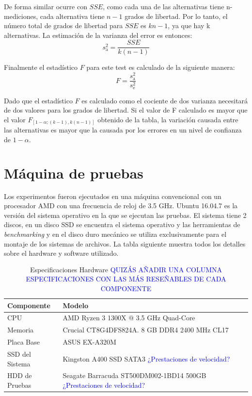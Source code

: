 De forma similar ocurre con $SSE$, como cada una de las alternativas tiene n-mediciones, cada alternativa tiene $n-1$ grados de libertad. Por lo tanto, el número total de grados de libertad para $SSE$ es $kn-1$, ya que hay k alternativas. La estimación de la varianza del error es entonces: 
$$
s_{\mathrm{a}}^{2}=\frac{S S E}{k(n-1)}
$$

Finalmente el estadístico $F$ para este test es calculado de la siguiente manera: $$
F=\frac{s_{\mathrm{a}}^{2}}{s_{\mathrm{e}}^{2}}
$$

Dado que el estadístico $F$ es calculado como el cociente de dos varianza necesitará de dos valores para los grados de libertad. Si el valor de F calculado es mayor que el valor $F_{[1-\alpha ;(k-1), k(n-1)]}$ obtenido de la tabla, la variación causada entre las alternativas es mayor que la causada por los errores en un nivel de confianza de $1-\alpha$.



\section{Máquina de pruebas}
Los experimentos fueron ejecutados en una máquina convencional con un procesador AMD con una frecuencia de reloj de 3.5 GHz. Ubuntu 16.04.7 es la versión del sistema operativo en la que se ejecutan las pruebas. El sistema tiene 2 discos, en un disco SSD se encuentra el sistema operativo y las herramientas de \textit{benchmarking} y en el disco duro mecánico se utiliza exclusivamente para el montaje de los sistemas de archivos. La tabla siguiente muestra todos los detalles sobre el hardware y software utilizado.
\begin{table}[h]
    \centering
    \begin{tabular}{|l|l|}
    \hline
        Componente & Modelo \\ \hline\hline
        CPU & AMD Ryzen 3 1300X @ 3.5 GHz Quad-Core \\ \hline
        Memoria & Crucial CT8G4DFS824A. 8 GB DDR4 2400 MHz CL17 \\ \hline
        Placa Base & ASUS EX-A320M \\ \hline
        SSD del Sistema & Kingston A400 SSD SATA3 \textcolor{blue}{¿Prestaciones de velocidad?} \\ \hline
        HDD de Pruebas & Seagate Barracuda ST500DM002-1BD14 500GB \textcolor{blue}{¿Prestaciones de velocidad?}\\ \hline
    \end{tabular}
    \caption{Especificaciones Hardware \textcolor{blue}{QUIZÁS AÑADIR UNA COLUMNA ESPECIFICACIONES CON LAS MÁS RESEÑABLES DE CADA COMPONENTE}}
\label{table:1}
\end{table}

